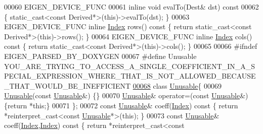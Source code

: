 \begin{DoxyCode}
00060     EIGEN\_DEVICE\_FUNC
00061     \textcolor{keyword}{inline} \textcolor{keywordtype}{void} evalTo(Dest& dst)\textcolor{keyword}{ const}
00062 \textcolor{keyword}{    }\{ \textcolor{keyword}{static\_cast<}\textcolor{keyword}{const }Derived*\textcolor{keyword}{>}(\textcolor{keyword}{this})->evalTo(dst); \}
00063     EIGEN\_DEVICE\_FUNC \textcolor{keyword}{inline} \hyperlink{namespace_eigen_a62e77e0933482dafde8fe197d9a2cfde}{Index} rows()\textcolor{keyword}{ const }\{ \textcolor{keywordflow}{return} \textcolor{keyword}{static\_cast<}\textcolor{keyword}{const }Derived*\textcolor{keyword}{>}(\textcolor{keyword}{this})->rows(); \}
00064     EIGEN\_DEVICE\_FUNC \textcolor{keyword}{inline} \hyperlink{namespace_eigen_a62e77e0933482dafde8fe197d9a2cfde}{Index} cols()\textcolor{keyword}{ const }\{ \textcolor{keywordflow}{return} \textcolor{keyword}{static\_cast<}\textcolor{keyword}{const }Derived*\textcolor{keyword}{>}(\textcolor{keyword}{this})->cols(); \}
00065 
00066 \textcolor{preprocessor}{#ifndef EIGEN\_PARSED\_BY\_DOXYGEN}
00067 \textcolor{preprocessor}{#define Unusable
       YOU\_ARE\_TRYING\_TO\_ACCESS\_A\_SINGLE\_COEFFICIENT\_IN\_A\_SPECIAL\_EXPRESSION\_WHERE\_THAT\_IS\_NOT\_ALLOWED\_BECAUSE\_THAT\_WOULD\_BE\_INEFFICIENT}
\hyperlink{class_eigen_1_1_return_by_value_1_1_unusable}{00068}     \textcolor{keyword}{class }\hyperlink{class_eigen_1_1_return_by_value_1_1_unusable}{Unusable}\{
00069       \hyperlink{class_eigen_1_1_return_by_value_1_1_unusable}{Unusable}(\textcolor{keyword}{const} \hyperlink{class_eigen_1_1_return_by_value_1_1_unusable}{Unusable}&) \{\}
00070       \hyperlink{class_eigen_1_1_return_by_value_1_1_unusable}{Unusable}& operator=(\textcolor{keyword}{const} \hyperlink{class_eigen_1_1_return_by_value_1_1_unusable}{Unusable}&) \{\textcolor{keywordflow}{return} *\textcolor{keyword}{this};\}
00071     \};
00072     \textcolor{keyword}{const} \hyperlink{class_eigen_1_1_return_by_value_1_1_unusable}{Unusable}& coeff(\hyperlink{namespace_eigen_a62e77e0933482dafde8fe197d9a2cfde}{Index})\textcolor{keyword}{ const }\{ \textcolor{keywordflow}{return} *\textcolor{keyword}{reinterpret\_cast<}\textcolor{keyword}{const }
      \hyperlink{class_eigen_1_1_return_by_value_1_1_unusable}{Unusable}*\textcolor{keyword}{>}(\textcolor{keyword}{this}); \}
00073     \textcolor{keyword}{const} \hyperlink{class_eigen_1_1_return_by_value_1_1_unusable}{Unusable}& coeff(\hyperlink{namespace_eigen_a62e77e0933482dafde8fe197d9a2cfde}{Index},\hyperlink{namespace_eigen_a62e77e0933482dafde8fe197d9a2cfde}{Index})\textcolor{keyword}{ const }\{ \textcolor{keywordflow}{return} *\textcolor{keyword}{reinterpret\_cast<}\textcolor{keyword}{const }

\end{DoxyCode}
